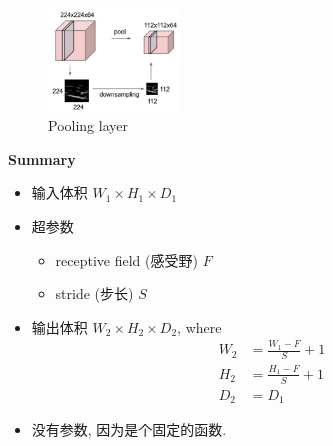 \begin{figure}[!htb]
    \centering
    \includegraphics[width=0.309\textwidth]{pic/Lec5/Pooling layer.png}
    \caption{Pooling layer}
\end{figure}

\textbf{Summary}
\begin{itemize}
    \item 输入体积 $W_1\times H_1 \times  D_1$
    \item 超参数
    \begin{itemize}
        \item receptive field (感受野) $F$
        \item stride (步长) $S$
    \end{itemize}
    \item 输出体积 $W_2\times H_2 \times  D_2$, where
    \begin{align*}
        W_2&=\frac{W_1 -F}{S}+1\\
        H_2&=\frac{H_1 -F}{S}+1\\
        D_2&=D_1
    \end{align*}
    \item 没有参数, 因为是个固定的函数. 
\end{itemize}

